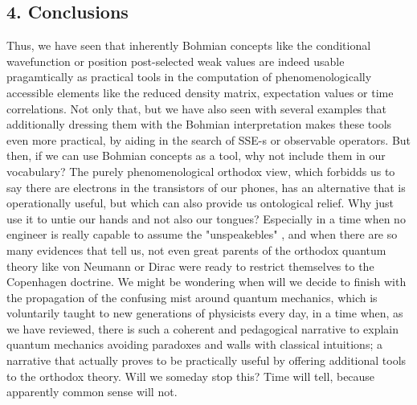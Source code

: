 \documentclass[11pt, a4paper]{article} %
\begin{document}
\subsection*{4. Conclusions}\vspace{-0.15cm}
Thus, we have seen that inherently Bohmian concepts like the conditional wavefunction or position post-selected weak values are indeed usable pragamtically as practical tools in the computation of phenomenologically accessible elements like the reduced density matrix, expectation values or time correlations. Not only that, but we have also seen with several examples that additionally dressing them with the Bohmian interpretation makes these tools even more practical, by aiding in the search of SSE-s or observable operators. But then, if we can use Bohmian concepts as a tool, why not include them in our vocabulary? The purely phenomenological orthodox view, which forbidds us to say there are electrons in the transistors of our phones, has an alternative that is operationally useful, but which can also provide us ontological relief. Why just use it to untie our hands and not also our tongues? Especially in a time when no engineer is really capable to assume the "unspeakebles" \cite{where}, and when there are so many evidences that tell us, not even great parents of the orthodox quantum theory like von Neumann \cite{NeumannNoCollapse} or Dirac \cite{Dirac} were ready to restrict themselves to the Copenhagen doctrine. We might be wondering when will we decide to finish with the propagation of the confusing mist around quantum mechanics, which is voluntarily taught to new generations of physicists every day, in a time when, as we have reviewed, there is such a coherent and pedagogical narrative to explain quantum mechanics avoiding paradoxes and walls with classical intuitions; a narrative that actually proves to be practically useful by offering additional tools to the orthodox theory. Will we someday stop this? Time will tell, because apparently common sense will not.

\end{document}

